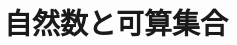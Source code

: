 \setcounter{section}{0}
\section{自然数と可算集合}
\label{section:自然数と可算集合}







%

%





%

%



%



%




